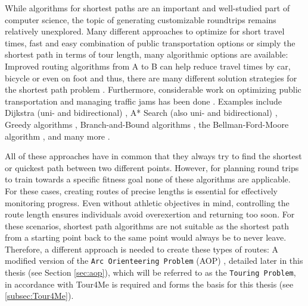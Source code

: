 While algorithms for shortest paths are an important and well-studied part of computer science, the topic of generating customizable roundtrips remains relatively unexplored.
Many different approaches to optimize for short travel times, fast and easy combination of public transportation options or simply the shortest path in terms of tour length, many algorithmic options are available:
Improved routing algorithms from A to B can help reduce travel times by car, bicycle or even on foot and thus, there are many different solution strategies for the shortest path problem \cite{cherkassky_shortest_1996, deo_shortest-path_1984, gallo_shortest_1988, sommer_shortest-path_2014, wayahdi_greedy_2021}.
Furthermore, considerable work on optimizing public transportation \cite{bast_route_2016, } and managing traffic jams has been done \cite{delling_time-dependent_2011, delling_customizable_2017}. 
Examples include Dijkstra (uni- and bidirectional) \cite{sommer_shortest-path_2014, wayahdi_greedy_2021}, A* Search (also uni- and bidirectional) \cite{sommer_shortest-path_2014, wayahdi_greedy_2021}, Greedy algorithms \cite{wayahdi_greedy_2021}, Branch-and-Bound algorithms \cite{lawler_branch-and-bound_1966}, the Bellman-Ford-Moore algorithm \cite{cherkassky_shortest_1996}, and many more \cite{delling_engineering_2009, gallo_shortest_1988, sommer_shortest-path_2014}.

All of these approaches have in common that they always try to find the shortest or quickest path between two different points.
However, for planning round trips to train towards a specific fitness goal none of these algorithms are applicable.
For these cases,  creating routes of precise lengths is essential for effectively monitoring progress.
Even without athletic objectives in mind, controlling the route length ensures individuals avoid overexertion and returning too soon.
For these scenarios, shortest path algorithms are not suitable as the shortest path from a starting point back to the same point would always be to never leave. 
Therefore, a different approach is needed to create these types of routes:
A modified version of the \texttt{Arc Orienteering Problem} (AOP) \cite{souffriau_planning_2011}, detailed later in this thesis (see Section \ref{sec:aop}), which will be referred to as the \texttt{Touring Problem}, in accordance with Tour4Me \cite{buchin_tour4me_2022} is required and forms the basis for this thesis (see \ref{subsec:Tour4Me}).



